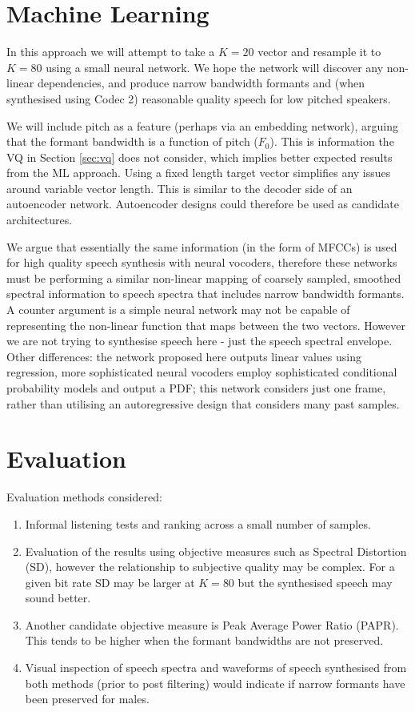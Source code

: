 \documentclass{article}
\begin{document}
\section{Machine Learning}

In this approach we will attempt to take a $K=20$ vector and resample it to $K=80$ using a small neural network.   We hope the network will discover any non-linear dependencies, and produce narrow bandwidth formants and (when synthesised using Codec 2) reasonable quality speech for low pitched speakers.  

We will include pitch as a feature (perhaps via an embedding network), arguing that the formant bandwidth is a function of pitch ($F_0$).  This is information the VQ in Section \ref{sec:vq} does not consider, which implies better expected results from the ML approach. Using a fixed length target vector simplifies any issues around variable vector length.  This is similar to the decoder side of an autoencoder network.  Autoencoder designs could therefore be used as candidate architectures.

We argue that essentially the same information (in the form of MFCCs) is used for high quality speech synthesis with neural vocoders, therefore these networks must be performing a similar non-linear mapping of coarsely sampled, smoothed spectral information to speech spectra that includes narrow bandwidth formants.  A counter argument is a simple neural network may not be capable of representing the non-linear function that maps between the two vectors.  However we are not trying to synthesise speech here - just the speech spectral envelope.  Other differences: the network proposed here outputs linear values using regression, more sophisticated neural vocoders employ sophisticated conditional probability models and output a PDF; this network considers just one frame, rather than utilising an autoregressive design that considers many past samples.

\section{Evaluation}

Evaluation methods considered:
\begin{enumerate}
\item Informal listening tests and ranking across a small number of samples.
\item Evaluation of the results using objective measures such as Spectral Distortion (SD), however the relationship to subjective quality may be complex.  For a given bit rate SD may be larger at $K=80$ but the synthesised speech may sound better.
\item Another candidate objective measure is Peak Average Power Ratio (PAPR). This tends to be higher when the formant bandwidths are not preserved.
\item Visual inspection of speech spectra and waveforms of speech synthesised from both methods (prior to post filtering) would indicate if narrow formants have been preserved for males.
\end{enumerate}
	
\end{document}
